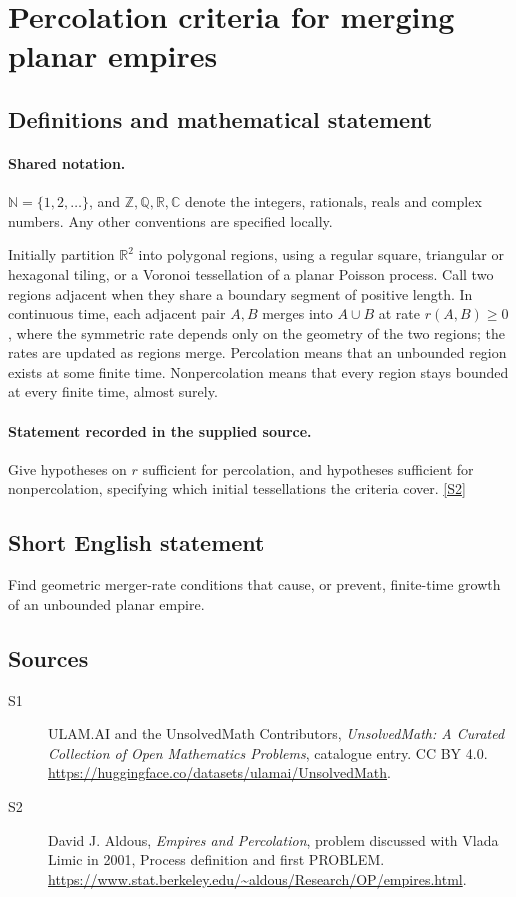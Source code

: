 \documentclass[11pt]{article}
\newcommand{\sref}[2]{\hyperlink{source:#1:#2}{[S#2]}}
\begin{document}
\section{Percolation criteria for merging planar empires}\label{statement}

\subsection{Definitions and mathematical statement}

\paragraph{Shared notation.}$\mathbb N=\{1,2,\ldots\}$, and $\mathbb Z,\mathbb Q,\mathbb R,\mathbb C$ denote the integers, rationals, reals and complex numbers. Any other conventions are specified locally.


Initially partition $\mathbb R^2$ into polygonal regions, using a regular square, triangular or hexagonal tiling, or a Voronoi tessellation of a planar Poisson process. Call two regions adjacent when they share a boundary segment of positive length. In continuous time, each adjacent pair $A,B$ merges into $A\cup B$ at rate $r(A,B)\ge0$, where the symmetric rate depends only on the geometry of the two regions; the rates are updated as regions merge. Percolation means that an unbounded region exists at some finite time. Nonpercolation means that every region stays bounded at every finite time, almost surely.
\paragraph{Statement recorded in the supplied source.}
Give hypotheses on $r$ sufficient for percolation, and hypotheses sufficient for nonpercolation, specifying which initial tessellations the criteria cover. \sref{statement}{2}
\subsection{Short English statement}
Find geometric merger-rate conditions that cause, or prevent, finite-time growth of an unbounded planar empire.
\subsection{Sources}
\begin{description}
\item[\hypertarget{source:statement:1}{S1}] ULAM.AI and the UnsolvedMath Contributors, \emph{UnsolvedMath: A Curated Collection of Open Mathematics Problems}, catalogue entry. CC BY 4.0. \url{https://huggingface.co/datasets/ulamai/UnsolvedMath}.
\item[\hypertarget{source:statement:2}{S2}] David J. Aldous, \emph{Empires and Percolation}, problem discussed with Vlada Limic in 2001, Process definition and first PROBLEM. \url{https://www.stat.berkeley.edu/~aldous/Research/OP/empires.html}.
\end{description}
\label{end:statement}
\end{document}
